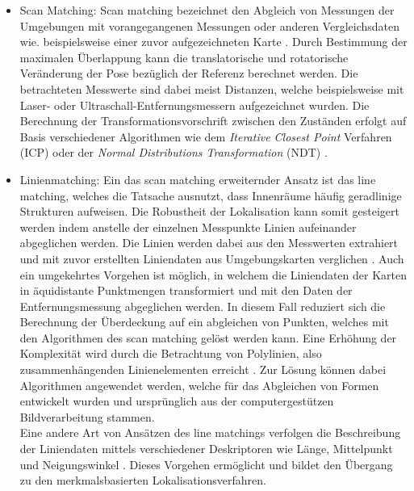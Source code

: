 \begin{itemize}

\item Scan Matching: Scan matching bezeichnet den Abgleich von Messungen der Umgebungen mit vorangegangenen Messungen \cite{Gutmann1996} oder anderen Vergleichsdaten wie. beispielsweise einer zuvor aufgezeichneten Karte \cite{Gutmann1998}. Durch Bestimmung der maximalen Überlappung kann die translatorische und rotatorische Veränderung der Pose bezüglich der Referenz berechnet werden. Die betrachteten Messwerte sind dabei meist Distanzen, welche beispielsweise mit Laser- \cite{Diosi2007} oder Ultraschall-Entfernungsmessern \cite{Burguera2005} aufgezeichnet wurden. Die Berechnung der Transformationsvorschrift zwischen den Zuständen erfolgt auf Basis verschiedener Algorithmen wie dem \textit{Iterative Closest Point} Verfahren (ICP) \cite{Besl1992}\cite{Lu1994} oder der \textit{Normal Distributions Transformation} (NDT) \cite{Biber2003}.

\item Linienmatching: Ein das scan matching erweiternder Ansatz ist das line matching, welches die Tatsache ausnutzt, dass Innenräume häufig geradlinige Strukturen aufweisen. Die Robustheit der Lokalisation kann somit gesteigert werden indem anstelle der einzelnen Messpunkte Linien aufeinander abgeglichen werden. Die Linien werden dabei aus den Messwerten extrahiert und mit zuvor erstellten Liniendaten aus Umgebungskarten verglichen \cite{Cox1991}\cite{Gutmann1999}. Auch ein umgekehrtes Vorgehen ist möglich, in welchem die Liniendaten der Karten in äquidistante Punktmengen transformiert und mit den Daten der Entfernungsmessung abgeglichen werden. In diesem Fall reduziert sich die Berechnung der Überdeckung auf ein abgleichen von Punkten, welches mit den Algorithmen des scan matching gelöst werden kann. Eine Erhöhung der Komplexität wird durch die Betrachtung von Polylinien, also zusammenhängenden Linienelementen erreicht \cite{Wolter2004}. Zur Lösung können dabei Algorithmen angewendet werden, welche für das Abgleichen von Formen entwickelt wurden und ursprünglich aus der computergestützen Bildverarbeitung stammen.\\
Eine andere Art von Ansätzen des line matchings verfolgen die Beschreibung der Liniendaten mittels verschiedener Deskriptoren wie Länge, Mittelpunkt und Neigungswinkel . Dieses Vorgehen ermöglicht \red[XXX] und bildet den Übergang zu den merkmalsbasierten Lokalisationsverfahren.


\end{itemize}
